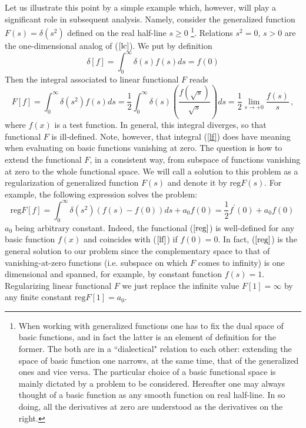 \documentclass[a4paper,12pt]{article}
\begin{document}
Let us illustrate this point by a simple example which, however, will play a
significant role in subsequent analysis. Namely, consider the generalized
function $F(s)=\delta(s^2)$ defined on the real half-line $s\geq 0$
\footnote{%
When working with generalized functions one has to fix the dual space of
basic functions, and in fact the latter is an element of definition for the
former. The both are in a ``dialectical" relation to each other: extending
the space of basic function one narrows, at the same time, that of the
generalized ones and vice versa. The particular choice of a basic functional
space is mainly dictated by a problem to be considered. Hereafter one may
always thought of a basic function as any smooth function on real half-line.
In so doing, all the derivatives at zero are understood as the derivatives
on the right.}. Relations $s^2=0$, $s>0$ are the one-dimensional analog of ($%
\ref{lc}$). We put by definition
\begin{equation}  \label{def}
\delta[f]=\int_0^{\infty}\delta(s)f(s)ds=f(0)
\end{equation}
Then the integral associated to linear functional $F$ reads
\begin{equation}  \label{lf}
F[f]=\int_{0}^{\infty} \delta (s^2)f(s)ds=\frac{1}2\int_0^{\infty}
\delta(s)\left(\frac{f(\sqrt{s})} {\sqrt{s}}\right)ds=\frac{1}%
2\lim_{s\rightarrow +0}\frac{f(s)}{s}\,,
\end{equation}
where $f(x)$ is a test function. In general, this integral diverges, so that
functional $F$ is ill-defined. Note, however, that integral (\ref{lf}) does
have meaning when evaluating on basic functions vanishing at zero. The
question is how to extend the functional $F$, in a consistent way, from
subspace of functions vanishing at zero to the whole functional space. We
will call a solution to this problem as a regularization of generalized
function $F(s)$ and denote it by $\text{reg} F(s)$. For example, the
following expression solves the problem:
\begin{equation}  \label{reg}
\text{reg} F[f]=\int_{0}^{\infty } \delta(s^2)(f(s)-f(0))ds + a_0f(0)=\frac
12f^{\prime}(0)+a_0f(0)\,
\end{equation}
$a_0$ being arbitrary constant. Indeed, the functional ($\ref{reg}$) is
well-defined for any basic function $f(x)$ and coincides with ($\ref{lf}$)
if $f(0)=0$. In fact, ($\ref{reg}$) is the general solution to our problem
since the complementary space to that of vanishing-at-zero functions (i.e.
subspace on which $F$ comes to infinity) is one dimensional and spanned, for
example, by constant function $f(s)=1$. Regularizing linear functional $F$
we just replace the infinite value $F[1]=\infty$ by any finite constant $%
\text{reg}F[1]=a_0$.
\end{document}
